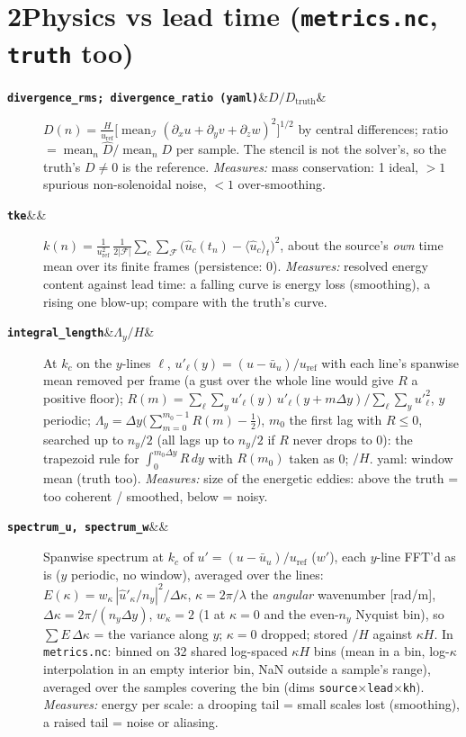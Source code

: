 \documentclass[10pt]{article}
\newcommand{\metric}[2]{\item[{\texttt{\textbf{#1}}\ifx&#2&\else\quad[table: #2]\fi}]}
\newcommand{\meas}{\emph{Measures:} }
\newcommand{\uref}{u_\mathrm{ref}}
\newcommand{\F}{\mathcal{F}}
\newcommand{\I}{\mathcal{I}}
\newcommand{\pred}[1]{\hat{#1}}
\DeclareMathOperator*{\mean}{mean}
\begin{document}
\section*{2\quad Physics vs lead time (\texttt{metrics.nc}, \texttt{truth} too)}
\begin{description}
\metric{divergence\_rms;\ divergence\_ratio \textnormal{(yaml)}}{$D/D_\mathrm{truth}$}
  $D(n) = \frac{H}{\uref}\bigl[\mean_{\I}(\partial_x u + \partial_y v
  + \partial_z w)^2\bigr]^{1/2}$ by central differences;
  ratio $= \mean_n \pred D / \mean_n D$ per sample. The stencil is not the
  solver's, so the truth's $D \ne 0$ is the reference. \meas mass
  conservation: 1 ideal, $>1$ spurious non-solenoidal noise, $<1$ over-smoothing.

\metric{tke}{}
  $k(n) = \frac{1}{\uref^2}\,\frac{1}{2|\F|}\sum_c\sum_{\F}\bigl(\pred{u}_c(t_n)
  - \langle\pred u_c\rangle_t\bigr)^2$, about the source's \emph{own} time mean
  over its finite frames (persistence: 0). \meas resolved energy content
  against lead time: a falling curve is energy loss (smoothing), a rising one
  blow-up; compare with the truth's curve.

\metric{integral\_length}{$\Lambda_y/H$}
  At $k_c$ on the $y$-lines $\ell$, $u'_\ell(y) = (u - \bar{u}_u)/\uref$
  with each line's spanwise mean removed per frame (a gust over the whole line
  would give $R$ a positive floor);
  $R(m) = \sum_\ell\sum_y u'_\ell(y)\,u'_\ell(y + m\Delta y) / \sum_\ell\sum_y u'^2_\ell$,
  $y$ periodic; $\Lambda_y = \Delta y\bigl(\sum_{m=0}^{m_0-1}R(m) - \tfrac12\bigr)$,
  $m_0$ the first lag with $R \le 0$, searched up to $n_y/2$ (all lags up
  to $n_y/2$ if $R$ never drops to 0): the trapezoid rule for
  $\int_0^{m_0\Delta y} R\,dy$ with $R(m_0)$ taken as 0; $/H$. yaml: window
  mean (truth too). \meas size of the energetic eddies: above the truth =
  too coherent / smoothed, below = noisy.

\metric{spectrum\_u, spectrum\_w}{}
  Spanwise spectrum at $k_c$ of $u'=(u-\bar u_u)/\uref$ ($w'$), each $y$-line
  FFT'd as is ($y$ periodic, no window), averaged over the lines:
  $E(\kappa) = w_\kappa\,|\hat{u}'_\kappa/n_y|^2/\Delta\kappa$,
  $\kappa = 2\pi/\lambda$ the \emph{angular} wavenumber [rad/m],
  $\Delta\kappa = 2\pi/(n_y\Delta y)$, $w_\kappa = 2$ (1 at $\kappa=0$ and the
  even-$n_y$ Nyquist bin), so $\sum E\,\Delta\kappa$ = the variance along $y$;
  $\kappa = 0$ dropped; stored $/H$ against $\kappa H$. In \texttt{metrics.nc}:
  binned on 32 shared log-spaced $\kappa H$ bins (mean in a bin, log-$\kappa$
  interpolation in an empty interior bin, NaN outside a sample's range),
  averaged over the samples covering the bin (dims
  \texttt{source}$\times$\texttt{lead}$\times$\texttt{kh}).
  \meas energy per scale: a drooping tail = small scales lost (smoothing), a
  raised tail = noise or aliasing.


\end{description}
\end{document}
